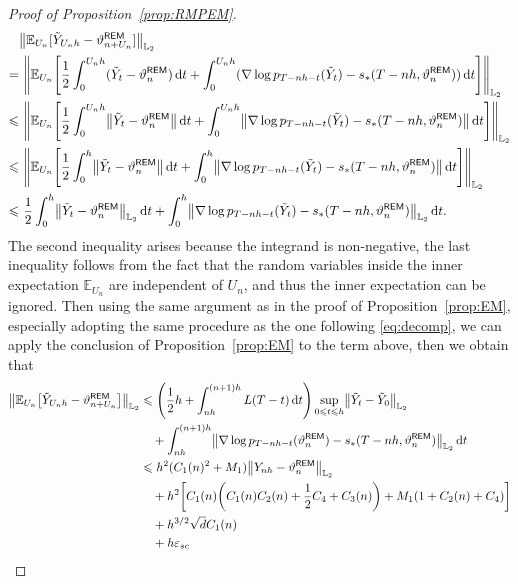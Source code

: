 \begin{proof}[Proof of Proposition~\ref{prop:RMPEM}]
\begin{align*}
    &\left\lVert \mathbb{E}_{U_n}[\tilde{Y}_{U_nh}-\vartheta_{n+U_n}^{\sf REM}]\right\rVert_{\Ltwo}\\
    =&\,\,\left\lVert\mathbb{E}_{U_n}\left[ \dfrac{1}{2}\int_0^{U_nh}(\tilde{Y}_t-\vartheta_n^{\sf REM})\rmd t+\int_0^{U_nh}(\nabla\log p_{T-nh-t}(\tilde{Y}_t)-s_*(T-nh,\vartheta_n^{\sf REM}))\rmd t\right]\right\rVert_{\Ltwo}\\
    \leqslant &\,\, \left\lVert\mathbb{E}_{U_n}\left[ \dfrac{1}{2}\int_0^{U_nh}\l|\tilde{Y}_t-\vartheta_n^{\sf REM}\r|\rmd t+\int_0^{U_nh}\l|\nabla\log p_{T-nh-t}(\tilde{Y}_t)-s_*(T-nh,\vartheta_n^{\sf REM})\r|\rmd t\right]\right\rVert_{\Ltwo}\\
    \leqslant &\,\,\left\lVert\mathbb{E}_{U_n}\left[\dfrac{1}{2}\int_0^{h}\l|\tilde{Y}_t-\vartheta_n^{\sf REM}\r|\rmd t+\int_0^h\l|\nabla\log p_{T-nh-t}(\tilde{Y}_t)-s_*(T-nh,\vartheta_n^{\sf REM})\r|\rmd t\right]\right\rVert_{\Ltwo}\\
    \leqslant &\,\,\dfrac{1}{2}\int_0^h\l|\tilde{Y}_t-\vartheta_n^{\sf REM}\r|_{\Ltwo}\rmd t+\int_0^h\l|\nabla\log p_{T-nh-t}(\tilde{Y}_t)-s_*(T-nh,\vartheta_n^{\sf REM})\r|_{\Ltwo}\rmd t.
\end{align*}
The second inequality arises because the integrand is non-negative, the last inequality follows from the fact that the random variables inside the inner expectation $\mathbb{E}_{U_n}$ are independent of $U_n$, and thus the inner expectation can be ignored. Then using the same argument as in the proof of Proposition~\ref{prop:EM}, especially adopting the same procedure as the one following \eqref{eq:decomp}, we can apply the conclusion of Proposition~\ref{prop:EM} to the term above, then we obtain that
\begin{align*}
    \l|\mathbb{E}_{U_n}\big[\tilde{Y}_{U_nh}-\vartheta_{n+U_n}^{\sf REM}\big]\r|_{\Ltwo}
    &\leqslant \left(\dfrac{1}{2}h+\int_{nh}^{(n+1)h}L(T-t)\rmd t\right)\sup_{0\leqslant t\leqslant h}\l|\tilde{Y}_t-\tilde{Y}_0\r|_{\Ltwo}\\
    & \quad +\int_{nh}^{(n+1)h}\l|\nabla\log p_{T-nh-t}(\vartheta_n^{\sf REM})-s_*(T-nh,\vartheta_n^{\sf REM})\r|_{\Ltwo}\rmd t\\
   & \leqslant h^2(C_1(n)^2+M_1)\l|Y_{nh}-\vartheta_n^{\sf REM}\r|_{\Ltwo}\\
    &\quad +h^2\left[C_1(n)\left(C_1(n)C_2(n)+\dfrac{1}{2}C_4+C_3(n)\right)+M_1(1+C_2(n)+C_4)\right]\\
    &\quad +h^{3/2}\sqrt{d}C_1(n)\\
    &\quad +h\varepsilon_{sc}\\

\end{align*}
\end{proof}
